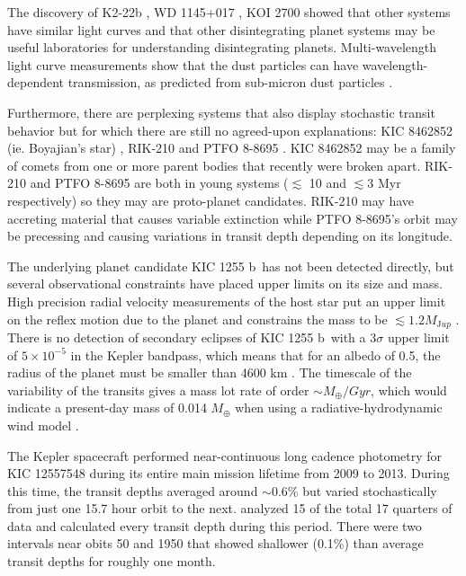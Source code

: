 \documentclass[twocolumn]{aastex61}
\newcommand{\sha}{KIC 1255 b}
\begin{document}
The discovery of K2-22b \citep{sanchis-ojedak2-22}, WD 1145+017 \citep{vanderburg2015wdDisintegrating}, KOI 2700 \citep{rappaport2014KOI2700} showed that other systems have similar light curves and that other disintegrating planet systems may be useful laboratories for understanding disintegrating planets.
Multi-wavelength light curve measurements show that the dust particles can have wavelength-dependent transmission, as predicted from sub-micron dust particles \citep{bochinski2015evolving,sanchis-ojedak2-22}.

Furthermore, there are perplexing systems that also display stochastic transit behavior but for which there are still no agreed-upon explanations: KIC 8462852 (ie. Boyajian's star) \citep{boyajian846}, RIK-210 \citep{david2017rik210} and PTFO 8-8695 \citep{vanEyken2012ptfTTauri}.
KIC 8462852 may be a family of comets from one or more parent bodies that recently were broken apart.
RIK-210 and PTFO 8-8695 are both in young systems ($\lesssim$ 10 and $\lesssim$3 Myr respectively) so they may are proto-planet candidates.
RIK-210 may have accreting material that causes variable extinction while PTFO 8-8695's orbit may be precessing and causing variations in transit depth depending on its longitude.

The underlying planet candidate \sha\ has not been detected directly, but several observational constraints have placed upper limits on its size and mass.
High precision radial velocity measurements of the host star put an upper limit on the reflex motion due to the planet and constrains the mass to be $\lesssim 1.2 M_{\mathrm Jup}$ \citep{croll2014}.
There is no detection of secondary eclipses of \sha\ with a 3$\sigma$ upper limit of $5 \times 10^{-5}$ in the Kepler bandpass, which means that for an albedo of 0.5, the radius of the planet must be smaller than 4600 km \citep{vanWerkhoven2014}.
The timescale of the variability of the transits gives a mass lot rate of order $\sim M_\oplus/Gyr$, which would indicate a present-day mass of 0.014 $M_\oplus$ when using a radiative-hydrodynamic wind model \citep{perez-becker}.

The Kepler spacecraft performed near-continuous long cadence photometry for KIC 12557548 during its entire main mission lifetime from 2009 to 2013.
During this time, the transit depths averaged around $\sim$0.6\% but varied stochastically from just one 15.7 hour orbit to the next.
\citet{vanWerkhoven2014} analyzed 15 of the total 17 quarters of data and calculated every transit depth during this period.
There were two intervals near obits 50 and 1950 that showed shallower (0.1\%) than average transit depths for roughly one month.
\end{document}
